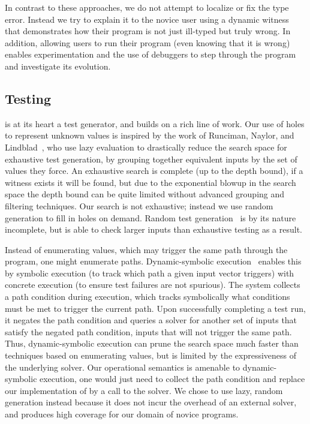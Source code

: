 In contrast to these approaches, we do not attempt to localize or fix
the type error. Instead we try to explain it to the novice user using a
dynamic witness that demonstrates how their program is not just
ill-typed but truly wrong. In addition, allowing users to run their
program (even knowing that it is wrong) enables experimentation and the
use of debuggers to step through the program and investigate its
evolution.

\subsection{Testing}
\label{sec:testing}
\nanomaly is at its heart a test generator, and builds on a rich line of
work.
%
Our use of holes to represent unknown values is inspired by the work of
Runciman, Naylor, and Lindblad~\cite{runciman_smallcheck_2008,naylor_finding_2007,lindblad_property_2007},
%
who use lazy evaluation to drastically reduce the search space for
exhaustive test generation, by grouping together equivalent inputs by
the set of values they force. An exhaustive search is complete (up to
the depth bound), if a witness exists it will be found, but due to the
exponential blowup in the search space the depth bound can be quite
limited without advanced grouping and filtering techniques.
%
Our search is not exhaustive; instead we use random generation to fill
in holes on demand.
%
Random test generation~\cite{claessen_quickcheck:_2000,csallner_jcrasher:_2004,pacheco_feedback-directed_2007}
%
is by its nature incomplete, but is able to check larger inputs than
exhaustive testing as a result.

Instead of enumerating values, which may trigger the same path through
the program, one might enumerate paths. 
%
Dynamic-symbolic execution~\cite{godefroid_dart:_2005,cadar_klee:_2008,tillmann_pex_2008}
%
enables this by symbolic execution (to track which path a given input
vector triggers) with concrete execution (to ensure test failures are
not spurious). The system collects a path condition during execution,
which tracks symbolically what conditions must be met to trigger the
current path. Upon successfully completing a test run, it negates the
path condition and queries a solver for another set of inputs that
satisfy the negated path condition, \ie inputs that will not trigger the
same path. Thus, dynamic-symbolic execution can prune the search space
much faster than techniques based on enumerating values, but is limited
by the expressiveness of the underlying solver. Our operational
semantics is amenable to dynamic-symbolic execution, one would just need
to collect the path condition and replace our implementation of \gensym
by a call to the solver. We chose to use lazy, random generation instead
because it does not incur the overhead of an external solver, and
produces high coverage for our domain of novice programs.

